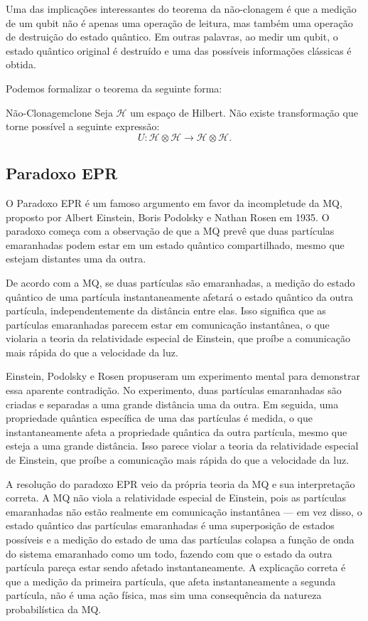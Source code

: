 Uma das implicações interessantes do teorema da não-clonagem é que a medição de um qubit não é apenas uma operação de leitura, mas também uma operação de destruição do estado quântico. Em outras palavras, ao medir um qubit, o estado quântico original é destruído e uma das possíveis informações clássicas é obtida. 

Podemos formalizar o teorema da seguinte forma:

\begin{theo}{Não-Clonagem}{clone}
  Seja $\mathcal{H}$ um espaço de Hilbert. Não existe transformação que torne possível a seguinte expressão:
  \begin{equation}
    U: \mathcal{H} \otimes \mathcal{H} \longrightarrow \mathcal{H} \otimes \mathcal{H}.
  \end{equation}
\end{theo}

\subsection{Paradoxo EPR}\label{sec:epr}

O Paradoxo EPR é um famoso argumento em favor da incompletude da MQ, proposto por Albert Einstein, Boris Podolsky e Nathan Rosen em 1935. O paradoxo começa com a observação de que a MQ prevê que duas partículas emaranhadas podem estar em um estado quântico compartilhado, mesmo que estejam distantes uma da outra.

De acordo com a MQ, se duas partículas são emaranhadas, a medição do estado quântico de uma partícula instantaneamente afetará o estado quântico da outra partícula, independentemente da distância entre elas. Isso significa que as partículas emaranhadas parecem estar em comunicação instantânea, o que violaria a teoria da relatividade especial de Einstein, que proíbe a comunicação mais rápida do que a velocidade da luz.

Einstein, Podolsky e Rosen propuseram um experimento mental para demonstrar essa aparente contradição. No experimento, duas partículas emaranhadas são criadas e separadas a uma grande distância uma da outra. Em seguida, uma propriedade quântica específica de uma das partículas é medida, o que instantaneamente afeta a propriedade quântica da outra partícula, mesmo que esteja a uma grande distância. Isso parece violar a teoria da relatividade especial de Einstein, que proíbe a comunicação mais rápida do que a velocidade da luz.

A resolução do paradoxo EPR veio da própria teoria da MQ e sua interpretação correta. A MQ não viola a relatividade especial de Einstein, pois as partículas emaranhadas não estão realmente em comunicação instantânea --- em vez disso, o estado quântico das partículas emaranhadas é uma superposição de estados possíveis e a medição do estado de uma das partículas colapsa a função de onda do sistema emaranhado como um todo, fazendo com que o estado da outra partícula pareça estar sendo afetado instantaneamente. A explicação correta é que a medição da primeira partícula, que afeta instantaneamente a segunda partícula, não é uma ação física, mas sim uma consequência da natureza probabilística da MQ.


